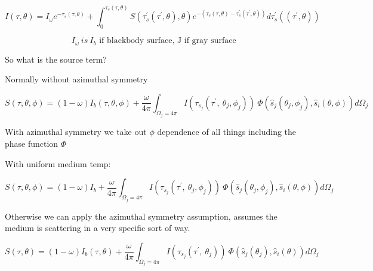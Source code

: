 \documentclass[12pt]{article}
\renewcommand{\_}{\kern-1.5pt\textunderscore\kern-1.5pt}
\begin{document}
 \[ I \left(  \tau, \theta  \right) =I_{ \omega }e^{- \tau_{s} \left(  \tau, \theta  \right) }+ \int _{0}^{ \tau_{s} \left(  \tau, \theta  \right) }S \left(  \tau_{s}^{'} \left(  \tau^{'}, \theta  \right) , \theta  \right) e^{- \left(  \tau_{s} \left(  \tau, \theta  \right) - \tau_{s}^{'} \left(  \tau^{'}, \theta  \right)  \right) }d \tau_{s}^{'} \left(  \left(  \tau^{'}, \theta  \right)  \right)  \] \par

 \[ I_{ \omega }~is~I_{b}\text{ if blackbody surface, J if gray surface } \] \par

So what is the source term?\par

Normally without azimuthal symmetry\par

 \[ S \left(  \tau, \theta , \phi  \right) = \left( 1- \omega  \right)  I_{b} \left(  \tau,  \theta , \phi  \right) +\frac{ \omega }{4 \pi } \int _{ \Omega _{j}=4 \pi }^{}I \left(  \tau_{s_{j}} \left(  \tau^{'},~ \theta _{j}, \phi _{j} \right)  \right) ~ \Phi  \left( \hat{s}_{j} \left(  \theta _{j}, \phi _{j} \right) ,\hat{s}_{i} \left(  \theta , \phi  \right)  \right) d \Omega _{j} \] \par

With azimuthal symmetry we take out  \(  \phi  \)  dependence of all things including the phase function  \(  \Phi  \) \par

With uniform medium temp:\par

 \[ S \left(  \tau, \theta , \phi  \right) = \left( 1- \omega  \right) I_{b}+\frac{ \omega }{4 \pi } \int _{ \Omega _{j}=4 \pi }^{}I \left(  \tau_{s_{j}} \left(  \tau^{'},~ \theta _{j}, \phi _{j} \right)  \right) ~ \Phi  \left( \hat{s}_{j} \left(  \theta _{j}, \phi _{j} \right) ,\hat{s}_{i} \left(  \theta , \phi  \right)  \right) d \Omega _{j} \] \par

Otherwise we can apply the azimuthal symmetry assumption, assumes the medium is scattering in a very specific sort of way.\par

 \[ S \left(  \tau, \theta  \right) = \left( 1- \omega  \right)  I_{b} \left(  \tau,  \theta  \right) +\frac{ \omega }{4 \pi } \int _{ \Omega _{j}=4 \pi }^{}I \left(  \tau_{s_{j}} \left(  \tau^{'},~ \theta _{j} \right)  \right) ~ \Phi  \left( \hat{s}_{j} \left(  \theta _{j} \right) ,\hat{s}_{i} \left(  \theta  \right)  \right) d \Omega _{j} \] \par
\end{document}
